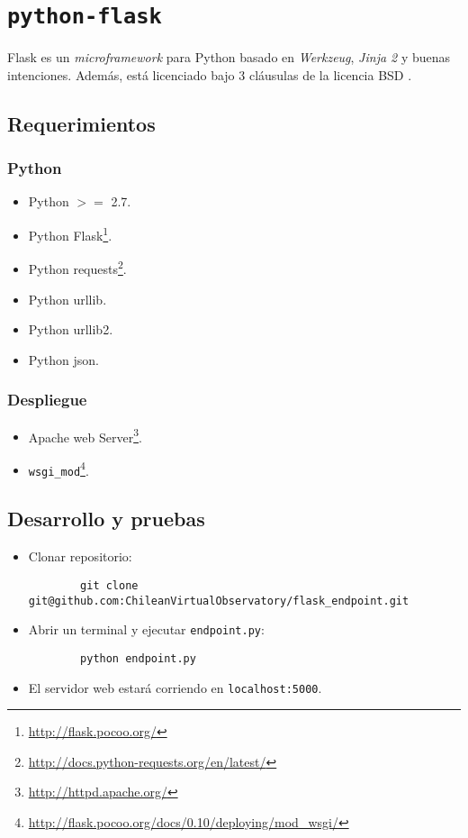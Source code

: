\section{\texttt{python-flask}}\label{anx:flask}

Flask es un \emph{microframework} para Python basado en \emph{Werkzeug}, \emph{Jinja 2} y buenas intenciones. Además, está licenciado bajo 3 cláusulas de la licencia BSD \cite{flask}.

\subsection*{Requerimientos}

\subsubsection*{Python}

\begin{itemize}
	\item Python $>=$ 2.7.
	\item Python Flask\footnote{\url{http://flask.pocoo.org/}}.
	\item Python requests\footnote{\url{http://docs.python-requests.org/en/latest/}}.
	\item Python urllib.
	\item Python urllib2.
	\item Python json.
\end{itemize}

\subsubsection*{Despliegue}

\begin{itemize}
	\item Apache web Server\footnote{\url{http://httpd.apache.org/}}.
	\item \verb;wsgi_mod;\footnote{\url{http://flask.pocoo.org/docs/0.10/deploying/mod\_wsgi/}}.
\end{itemize}

\subsection*{Desarrollo y pruebas}

\begin{itemize}
	\item Clonar repositorio:
		\begin{verbatim}
		git clone git@github.com:ChileanVirtualObservatory/flask_endpoint.git
	\end{verbatim}
	\item Abrir un terminal y ejecutar \verb;endpoint.py;:
		\begin{verbatim}
		python endpoint.py
	\end{verbatim}
	\item El servidor web estará corriendo en \verb;localhost:5000;.
\end{itemize}

